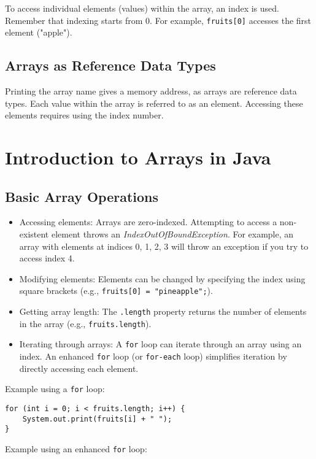 \documentclass{article}
\begin{document}
To access individual elements (values) within the array, an index is used.  Remember that indexing starts from 0.  For example, \texttt{fruits[0]} accesses the first element ("apple").

\subsection{Arrays as Reference Data Types}

Printing the array name gives a memory address, as arrays are reference data types.  Each value within the array is referred to as an element.  Accessing these elements requires using the index number.


\section{Introduction to Arrays in Java}

\subsection{Basic Array Operations}

\begin{itemize}
    \item Accessing elements: Arrays are zero-indexed.  Attempting to access a non-existent element throws an \textit{IndexOutOfBoundException}.  For example,  an array with elements at indices 0, 1, 2, 3 will throw an exception if you try to access index 4.
    \item Modifying elements: Elements can be changed by specifying the index using square brackets (e.g.,  \texttt{fruits[0] = "pineapple";}).
    \item Getting array length: The \texttt{.length} property returns the number of elements in the array (e.g., \texttt{fruits.length}).
    \item Iterating through arrays: A \texttt{for} loop can iterate through an array using an index.  An enhanced \texttt{for} loop (or \texttt{for-each} loop) simplifies iteration by directly accessing each element.
\end{itemize}

Example using a \texttt{for} loop:

\begin{verbatim}
for (int i = 0; i < fruits.length; i++) {
    System.out.print(fruits[i] + " ");
}
\end{verbatim}

Example using an enhanced \texttt{for} loop:
\end{document}
